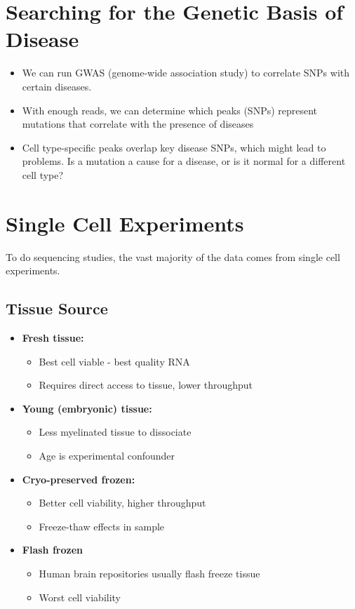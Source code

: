 \documentclass[10pt]{article}
\begin{document}
\section*{Searching for the Genetic Basis of Disease}
\begin{itemize}
	\item We can run GWAS (genome-wide association study) to correlate SNPs with certain diseases.
	\item With enough reads, we can determine which peaks (SNPs) represent mutations that correlate with the presence of diseases
	\item Cell type-specific peaks overlap key disease SNPs, which might lead to problems.  Is a mutation a cause for a disease, or is it normal for a different cell type?
\end{itemize}

\section*{Single Cell Experiments}
To do sequencing studies, the vast majority of the data comes from single cell experiments.

\subsection*{Tissue Source}
\begin{itemize}
	\item \textbf{Fresh tissue:}
	\begin{itemize}
	    \item Best cell viable - best quality RNA
	    \item Requires direct access to tissue, lower throughput
    \end{itemize}
	\item \textbf{Young (embryonic) tissue:}
	\begin{itemize}
        \item Less myelinated tissue to dissociate
        \item Age is experimental confounder
    \end{itemize}
	\item \textbf{Cryo-preserved frozen:}
	\begin{itemize}
        \item Better cell viability, higher throughput
        \item Freeze-thaw effects in sample
    \end{itemize}
	\item \textbf{Flash frozen}
	\begin{itemize}
        \item Human brain repositories usually flash freeze tissue
        \item Worst cell viability
    \end{itemize}
\end{itemize}
\end{document}
